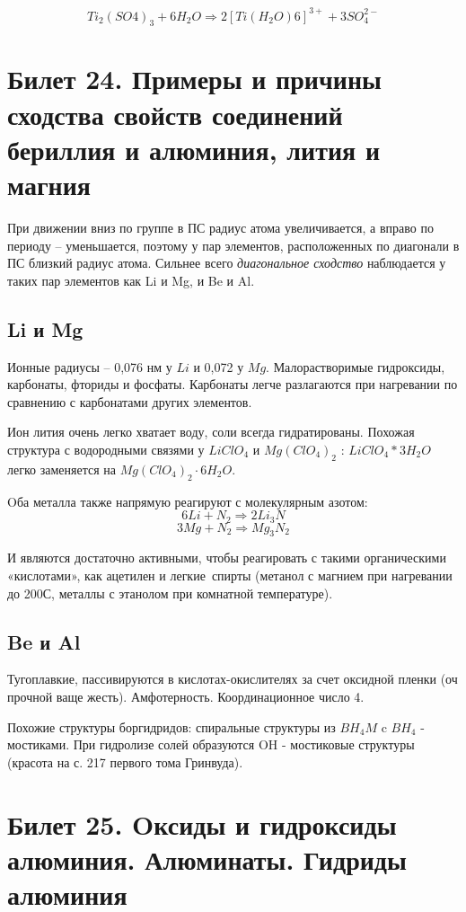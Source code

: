 \documentclass[11pt]{article}
\begin{document}
$$Ti_ 2 (SO4) _3 + 6H _2 O \Rightarrow 2[Ti(H _2 O) 6 ] ^{3+} + 3SO _4 ^{2-}$$



\section{Билет 24. Примеры и причины сходства свойств соединений бериллия и алюминия, лития и магния}

При движении вниз по группе в ПС радиус атома увеличивается, а вправо по
периоду – уменьшается, поэтому у пар элементов, расположенных по
диагонали в ПС близкий радиус атома. Сильнее всего \emph{диагональное сходство}
наблюдается у таких пар элементов как Li и Mg, и Be и Al.

\subsection{Li и Mg}

Ионные радиусы – 0,076 нм у $Li$ и 0,072 у $Mg$. Малорастворимые гидроксиды,
карбонаты, фториды и фосфаты. Карбонаты легче разлагаются при нагревании
по сравнению с карбонатами других элементов.

Ион лития очень легко хватает воду, соли всегда гидратированы. Похожая
структура с водородными связями у $LiClO _4$ и $Mg(ClO _4 ) _2$ : $LiClO _4 *3H _2 O$ легко
заменяется на $Mg(ClO _4 ) _2 \cdot 6H _2 O$.

Oба металла также напрямую реагируют с молекулярным азотом:
$$6Li + N _2 \Rightarrow 2Li _3 N$$
$$3Mg + N _2 \Rightarrow Mg _3 N _2$$

И являются достаточно активными, чтобы реагировать с такими органическими
«кислотами», как ацетилен и легкие спирты (метанол с магнием при
нагревании до 200С, металлы с этанолом при комнатной температуре).

\subsection{Be и Al}

Тугоплавкие, пассивируются в кислотах-окислителях за счет оксидной пленки
(оч прочной ваще жесть). Амфотерность. Координационное число 4.

Похожие структуры боргидридов: спиральные структуры из $BH _4 M$ c $BH _4$ -
мостиками. При гидролизе солей образуются OH - мостиковые структуры
(красота на с. 217 первого тома Гринвуда).


\section{Билет 25. Oксиды и гидроксиды алюминия. Алюминаты. Гидриды алюминия}
\end{document}

